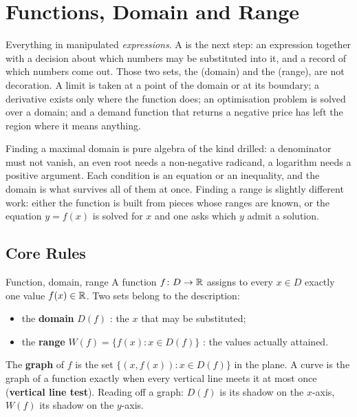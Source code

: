 \chapter{Functions, Domain and Range}

Everything in  manipulated \emph{expressions}. A
 is the next step: an expression together with a decision
about which numbers may be substituted into it, and a record of which
numbers come out. Those two sets, the  (domain) and
the  (range), are not decoration. A limit is taken at a
point of the domain or at its boundary; a derivative exists only where the
function does; an optimisation problem is solved over a domain; and a
demand function that returns a negative price has left the region where it
means anything.

Finding a maximal domain is pure algebra of the kind 
drilled: a denominator must not vanish, an even root needs a non-negative
radicand, a logarithm needs a positive argument. Each condition is an
equation or an inequality, and the domain is what survives all of them at
once. Finding a range is slightly different work: either the function is
built from pieces whose ranges are known, or the equation $y=f(x)$ is
solved for $x$ and one asks which $y$ admit a solution.

\section{Core Rules}

\begin{rulebox}{Function, domain, range}
A function $f\colon D\to\mathbb{R}$ assigns to every $x\in D$ exactly one value
$f(x)\in\mathbb{R}$. Two sets belong to the description:
\begin{itemize}[leftmargin=1.6em,itemsep=0.3ex]
  \item the \textbf{domain} $D(f)$ : the $x$ that
        may be substituted;
  \item the \textbf{range} $W(f)=\{f(x): x\in D(f)\}$
        : the values actually attained.
\end{itemize}
The \textbf{graph} of $f$ is the set $\{(x,f(x)) : x\in D(f)\}$ in the
plane. A curve is the graph of a function exactly when every vertical line
meets it at most once (\textbf{vertical line test}). Reading off a graph:
$D(f)$ is its shadow on the $x$-axis, $W(f)$ its shadow on the $y$-axis.
\end{rulebox}

